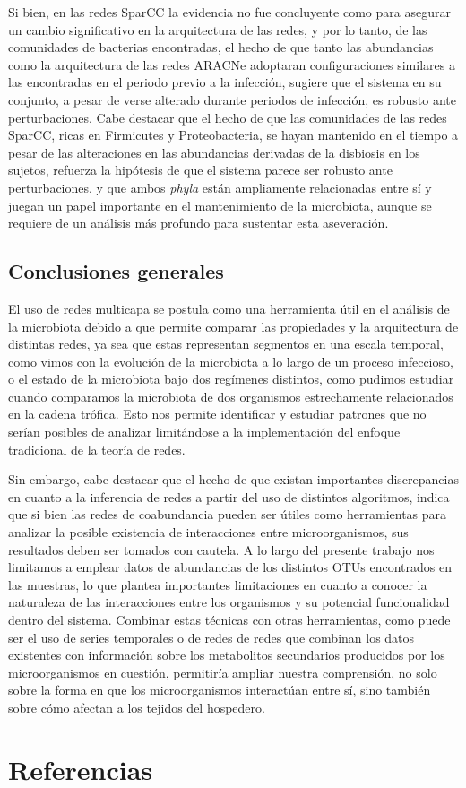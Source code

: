 \documentclass[
]{book}
\begin{document}
Si bien, en las redes SparCC la evidencia no fue concluyente como para asegurar un cambio significativo en la arquitectura de las redes, y por lo tanto, de las comunidades de bacterias encontradas, el hecho de que tanto las abundancias como la arquitectura de las redes ARACNe adoptaran configuraciones similares a las encontradas en el periodo previo a la infección, sugiere que el sistema en su conjunto, a pesar de verse alterado durante periodos de infección, es robusto ante perturbaciones. Cabe destacar que el hecho de que las comunidades de las redes SparCC, ricas en Firmicutes y Proteobacteria, se hayan mantenido en el tiempo a pesar de las alteraciones en las abundancias derivadas de la disbiosis en los sujetos, refuerza la hipótesis de que el sistema parece ser robusto ante perturbaciones, y que ambos \emph{phyla} están ampliamente relacionadas entre sí y juegan un papel importante en el mantenimiento de la microbiota, aunque se requiere de un análisis más profundo para sustentar esta aseveración.

\hypertarget{conclusiones-generales}{%
\section*{Conclusiones generales}\label{conclusiones-generales}}

El uso de redes multicapa se postula como una herramienta útil en el análisis de la microbiota debido a que permite comparar las propiedades y la arquitectura de distintas redes, ya sea que estas representan segmentos en una escala temporal, como vimos con la evolución de la microbiota a lo largo de un proceso infeccioso, o el estado de la microbiota bajo dos regímenes distintos, como pudimos estudiar cuando comparamos la microbiota de dos organismos estrechamente relacionados en la cadena trófica. Esto nos permite identificar y estudiar patrones que no serían posibles de analizar limitándose a la implementación del enfoque tradicional de la teoría de redes.

Sin embargo, cabe destacar que el hecho de que existan importantes discrepancias en cuanto a la inferencia de redes a partir del uso de distintos algoritmos, indica que si bien las redes de coabundancia pueden ser útiles como herramientas para analizar la posible existencia de interacciones entre microorganismos, sus resultados deben ser tomados con cautela. A lo largo del presente trabajo nos limitamos a emplear datos de abundancias de los distintos OTUs encontrados en las muestras, lo que plantea importantes limitaciones en cuanto a conocer la naturaleza de las interacciones entre los organismos y su potencial funcionalidad dentro del sistema. Combinar estas técnicas con otras herramientas, como puede ser el uso de series temporales o de redes de redes que combinan los datos existentes con información sobre los metabolitos secundarios producidos por los microorganismos en cuestión, permitiría ampliar nuestra comprensión, no solo sobre la forma en que los microorganismos interactúan entre sí, sino también sobre cómo afectan a los tejidos del hospedero.

\hypertarget{referencias}{%
\chapter*{Referencias}\label{referencias}}

  
\end{document}
